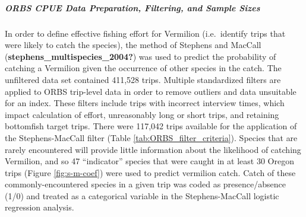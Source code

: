 \documentclass[11pt,
  english,
  a4paper,
]{article}
\begin{document}
\leavevmode\tagmcend\tagstructend\par


\hypertarget{orbs-cpue-data-preparation-filtering-and-sample-sizes}{%
\subparagraph{ORBS CPUE Data Preparation, Filtering, and Sample Sizes}\label{orbs-cpue-data-preparation-filtering-and-sample-sizes}}

\leavevmode\tagmcend\tagstructend


In order to define effective fishing effort for Vermilion (i.e.~identify trips that were likely to catch the species), the method of Stephens and MacCall {(\textbf{stephens\_multispecies\_2004?})\leavevmode\tagmcend\tagstructend} was used to predict the probability of catching a Vermilion given the occurrence of other species in the catch. The unfiltered data set contained 411,528 trips. Multiple standardized filters are applied to ORBS trip-level data in order to remove outliers and data unsuitable for an index. These filters include trips with incorrect interview times, which impact calculation of effort, unreasonably long or short trips, and retaining bottomfish target trips. There were 117,042 trips available for the application of the Stephens-MacCall filter (Table \ref{tab:ORBS_filter_criteria}). Species that are rarely encountered will provide little information about the likelihood of catching Vermilion, and so 47 ``indicator'' species that were caught in at least 30 Oregon trips (Figure \ref{fig:s-m-coef}) were used to predict vermilion catch. Catch of these commonly-encountered species in a given trip was coded as presence/absence (1/0) and treated as a categorical variable in the Stephens-MacCall logistic regression analysis.

\leavevmode\tagmcend\tagstructend\par

\end{document}

